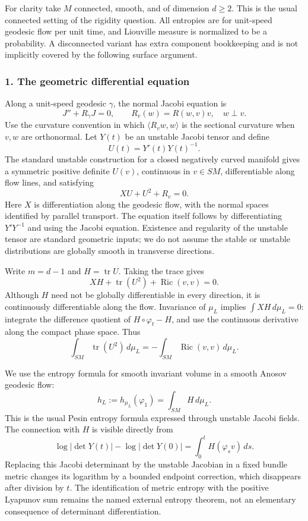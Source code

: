 \documentclass[11pt]{article}
\begin{document}
For clarity take $M$ connected, smooth, and of dimension $d\geq2$. This is the usual connected setting of the rigidity question. All entropies are for unit-speed geodesic flow per unit time, and Liouville measure is normalized to be a probability. A disconnected variant has extra component bookkeeping and is not implicitly covered by the following surface argument.

\subsubsection{1. The geometric differential equation}
Along a unit-speed geodesic $\gamma$, the normal Jacobi equation is
\[
 J''+R_{\dot\gamma}J=0,
 \qquad R_v(w)=R(w,v)v,\quad w\perp v.
\]
Use the curvature convention in which $\langle R_vw,w\rangle$ is the sectional curvature when $v,w$ are orthonormal. Let $Y(t)$ be an unstable Jacobi tensor and define
\[
 U(t)=Y'(t)Y(t)^{-1}.
\]
The standard unstable construction for a closed negatively curved manifold gives a symmetric positive definite $U(v)$, continuous in $v\in SM$, differentiable along flow lines, and satisfying
\[
 XU+U^2+R_v=0.                                         \tag{1}
\]
Here $X$ is differentiation along the geodesic flow, with the normal spaces identified by parallel transport. The equation itself follows by differentiating $Y'Y^{-1}$ and using the Jacobi equation. Existence and regularity of the unstable tensor are standard geometric inputs; we do not assume the stable or unstable distributions are globally smooth in transverse directions.

Write $m=d-1$ and $H=\operatorname{tr}U$. Taking the trace gives
\[
 XH+\operatorname{tr}(U^2)+\operatorname{Ric}(v,v)=0.
                                                               \tag{2}
\]
Although $H$ need not be globally differentiable in every direction, it is continuously differentiable along the flow. Invariance of $\mu_L$ implies $\int XH\,d\mu_L=0$: integrate the difference quotient of $H\circ\varphi_t-H$, and use the continuous derivative along the compact phase space. Thus
\[
 \int_{SM}\operatorname{tr}(U^2)\,d\mu_L
 =-\int_{SM}\operatorname{Ric}(v,v)\,d\mu_L.              \tag{3}
\]

We use the entropy formula for smooth invariant volume in a smooth Anosov geodesic flow:
\[
 h_L:=h_{\mu_L}(\varphi_1)=\int_{SM}H\,d\mu_L.            \tag{4}
\]
This is the usual Pesin entropy formula expressed through unstable Jacobi fields. The connection with $H$ is visible directly from
\[
 \log|\det Y(t)|-\log|\det Y(0)|
 =\int_0^t H(\varphi_s v)\,ds.
\]
Replacing this Jacobi determinant by the unstable Jacobian in a fixed bundle metric changes its logarithm by a bounded endpoint correction, which disappears after division by $t$. The identification of metric entropy with the positive Lyapunov sum remains the named external entropy theorem, not an elementary consequence of determinant differentiation.
\end{document}
